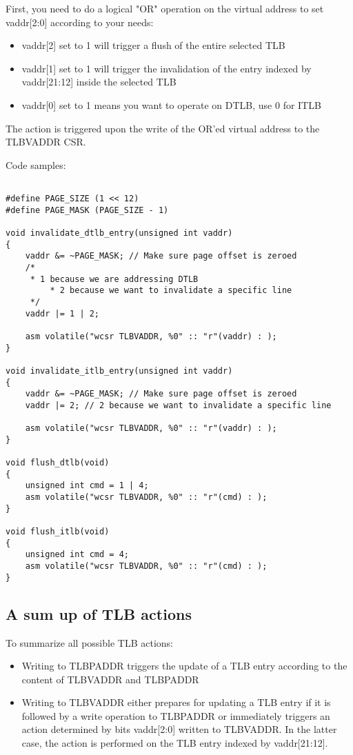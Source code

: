 \documentclass[a4paper,11pt]{article}
\begin{document}
First, you need to do a logical "OR" operation on the virtual address to set vaddr[2:0] according to your needs:

\begin{itemize}
	\item vaddr[2] set to 1 will trigger a flush of the entire selected TLB
	\item vaddr[1] set to 1 will trigger the invalidation of the entry indexed by vaddr[21:12] inside the selected TLB
	\item vaddr[0] set to 1 means you want to operate on DTLB, use 0 for ITLB
\end{itemize}

The action is triggered upon the write of the OR'ed virtual address to the TLBVADDR CSR.

Code samples:

\begin{lstlisting}

#define PAGE_SIZE (1 << 12)
#define PAGE_MASK (PAGE_SIZE - 1)

void invalidate_dtlb_entry(unsigned int vaddr)
{
	vaddr &= ~PAGE_MASK; // Make sure page offset is zeroed
	/*
	 * 1 because we are addressing DTLB
         * 2 because we want to invalidate a specific line
	 */
	vaddr |= 1 | 2;

	asm volatile("wcsr TLBVADDR, %0" :: "r"(vaddr) : );
}

void invalidate_itlb_entry(unsigned int vaddr)
{
	vaddr &= ~PAGE_MASK; // Make sure page offset is zeroed
	vaddr |= 2; // 2 because we want to invalidate a specific line

	asm volatile("wcsr TLBVADDR, %0" :: "r"(vaddr) : );
}

void flush_dtlb(void)
{
	unsigned int cmd = 1 | 4;
	asm volatile("wcsr TLBVADDR, %0" :: "r"(cmd) : );
}

void flush_itlb(void)
{
	unsigned int cmd = 4;
	asm volatile("wcsr TLBVADDR, %0" :: "r"(cmd) : );
}

\end{lstlisting}

\subsection{A sum up of TLB actions}

To summarize all possible TLB actions:

\begin{itemize}
	\item Writing to TLBPADDR triggers the update of a TLB entry according to the content of TLBVADDR and TLBPADDR
	\item Writing to TLBVADDR either prepares for updating a TLB entry if it is followed by a write operation to TLBPADDR or immediately triggers an action determined by bits vaddr[2:0] written to TLBVADDR. In the latter case, the action is performed on the TLB entry indexed by vaddr[21:12].
\end{itemize}
\end{document}
